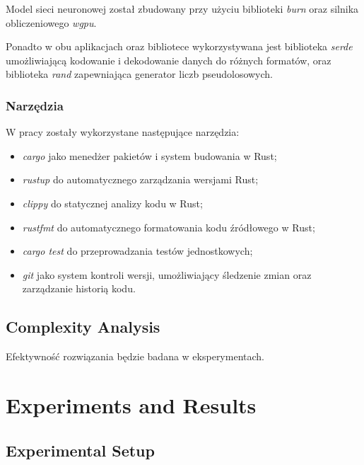 \documentclass{article}
\newcommand{\temporary}[1]{
    \begin{tcolorbox}[colframe=red, colback=white, title={\textbf{WERSJA PO POLSKU}}, sharp corners=south]
        #1
    \end{tcolorbox}
}
\begin{document}
{            Model sieci neuronowej został zbudowany przy użyciu biblioteki \textit{burn}\cite{Rust:burn} oraz silnika obliczeniowego \textit{wgpu}.

            Ponadto w obu aplikacjach oraz bibliotece wykorzystywana jest biblioteka \textit{serde}\cite{Rust:serde} umożliwiającą kodowanie i dekodowanie danych do różnych formatów, oraz biblioteka \textit{rand}\cite{Rust:rand} zapewniająca generator liczb pseudolosowych.

        \subsubsection{Narzędzia}

            W pracy zostały wykorzystane następujące narzędzia:
            \begin{itemize}
                \item \textit{cargo} jako menedżer pakietów i system budowania w Rust;
                \item \textit{rustup} do automatycznego zarządzania wersjami Rust;
                \item \textit{clippy} do statycznej analizy kodu w Rust;
                \item \textit{rustfmt} do automatycznego formatowania kodu źródłowego w Rust;
                \item \textit{cargo test} do przeprowadzania testów jednostkowych;
                \item \textit{git} jako system kontroli wersji, umożliwiający śledzenie zmian oraz zarządzanie historią kodu.
            \end{itemize}
            }

        \subsection{Complexity Analysis}

            \temporary{
                Efektywność rozwiązania będzie badana w eksperymentach.
            }

    \section{Experiments and Results}

        \subsection{Experimental Setup}
\end{document}
